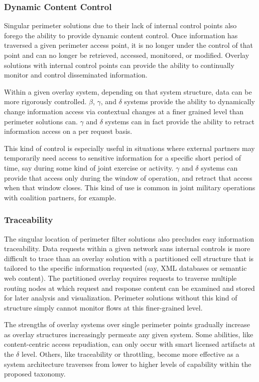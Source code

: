 \subsubsection*{Dynamic Content Control}
Singular perimeter solutions due to their lack of internal control points also forego the ability to provide dynamic content control.  Once information has traversed a given perimeter access point, it is no longer under the control of that point and can no longer be retrieved, accessed, monitored, or modified.  Overlay solutions with internal control points can provide the ability to continually monitor and control disseminated information.

Within a given overlay system, depending on that system structure, data can be more rigorously controlled.  $\beta$, $\gamma$, and $\delta$ systems provide the ability to dynamically change information access via contextual changes at a finer grained level than perimeter solutions can.  $\gamma$ and $\delta$ systems can in fact provide the ability to retract information access on a per request basis.

This kind of control is especially useful in situations where external partners may temporarily need access to sensitive information for a specific short period of time, say during some kind of joint exercise or activity.  $\gamma$ and $\delta$ systems can provide that access only during the window of operation, and retract that access when that window closes.  This kind of use is common in joint military operations with coalition partners, for example.

\subsubsection*{Traceability}
The singular location of perimeter filter solutions also precludes easy information traceability.  Data requests within a given network sans internal controls is more difficult to trace than an overlay solution with a partitioned cell structure that is tailored to the specific information requested (say, XML databases or semantic web content).  The partitioned overlay requires requests to traverse multiple routing nodes at which request and response content can be examined and stored for later analysis and visualization.  Perimeter solutions without this kind of structure simply cannot monitor flows at this finer-grained level.

The strengths of overlay systems over single perimeter points gradually increase as overlay structures increasingly permeate any given system.  Some abilities, like content-centric access repudiation, can only occur with smart licensed artifacts at the $\delta$ level.  Others, like traceability or throttling, become more effective as a system architecture traverses from lower to higher levels of capability within the proposed taxonomy.